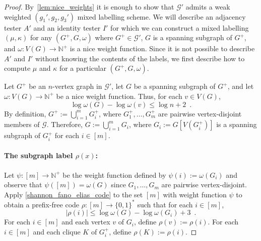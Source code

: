 \documentclass[twoside,leqno]{article}
\newcommand{\N}{\mathbb{N}}
\renewcommand{\le}{\leqslant}
\begin{document}
\begin{proof}
  By~\cref{lem:nice_weights} it is enough to show that $\mathcal{G}'$ admits a weak weighted $(g_1',g_2,g_3')$ mixed labelling scheme. We will describe an adjacency tester $A'$ and an identity tester $I'$ for which we can construct a mixed labelling $(\mu,\kappa)$ for any $(G^+,G,\omega)$ where $G^+\in\mathcal{G}'$, $G$ is a spanning subgraph of $G^+$, and $\omega:V(G)\to\N^+$ is a nice weight function.
  Since it is not possible to describe $A'$ and $I'$ without knowing the contents of the labels, we first describe how to compute $\mu$ and $\kappa$ for a particular $(G^+,G,\omega)$.

  Let $G^+$ be an $n$-vertex graph in $\mathcal{G}'$, let $G$ be a spanning subgraph of $G^+$, and let $\omega:V(G)\to\N^+$ be a nice weight function.
  Thus, for each $v\in V(G)$,
  \begin{equation}
    \label{eq:nice}
    \log\omega(G)-\log\omega(v)\le\log n + 2\enspace.
  \end{equation}
  By definition, $G^+:=\bigcup_{i=1}^m G^+_i$, where $G^+_1,\ldots,G^+_m$ are pairwise vertex-disjoint members of $\mathcal{G}$.
  Therefore, $G:=\bigcup_{i=1}^m G_i$, where $G_i:=G[V(G^+_i)]$ is a spanning subgraph of $G^+_i$ for each $i\in[m]$.

  \paragraph{The subgraph label $\rho(x)$:}
  Let $\psi:[m]\to\N^+$ be the weight function defined by $\psi(i):=\omega(G_i)$ and observe that $\psi([m])=\omega(G)$ since $G_1,\ldots,G_m$ are pairwise vertex-disjoint.
  Apply \cref{shannon_fano_elias_code} to the set $[m]$ with weight function $\psi$ to obtain a prefix-free code $\rho:[m]\to\{0,1\}^*$ such that for each $i\in[m]$,
  \begin{equation}
    \label{eq:pi}
    |\rho(i)|\le\log \omega(G)-\log \omega(G_i)+3\enspace.
  \end{equation}
  For each $i\in[m]$ and each vertex $v$ of $G_i$, define $\rho(v):=\rho(i)$. For each $i\in[m]$ and each clique $K$ of $G^+_i$, define $\rho(K):=\rho(i)$.


\end{proof}
\end{document}
